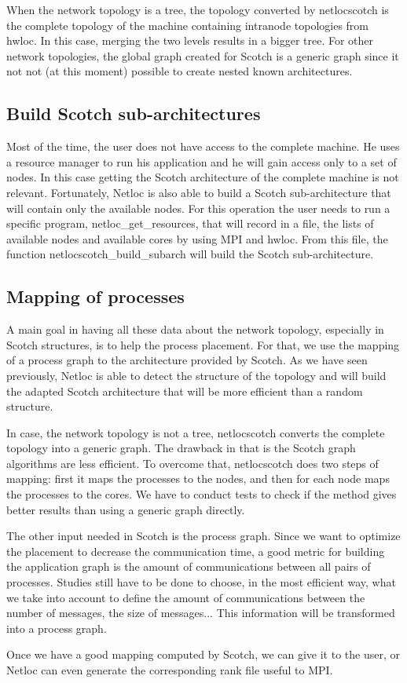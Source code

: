 When the network topology is a tree, the topology converted by netlocscotch is the complete topology of the machine containing intranode topologies from hwloc. In this case, merging the two levels results in a bigger tree. For other network topologies, the global graph created for Scotch is a generic graph since it not not (at this moment) possible to create nested known architectures.\hypertarget{a00397_netlocscotch_subarch}{}\subsection{Build Scotch sub-\/architectures}\label{a00397_netlocscotch_subarch}
Most of the time, the user does not have access to the complete machine. He uses a resource manager to run his application and he will gain access only to a set of nodes. In this case getting the Scotch architecture of the complete machine is not relevant. Fortunately, Netloc is also able to build a Scotch sub-\/architecture that will contain only the available nodes. For this operation the user needs to run a specific program, netloc\+\_\+get\+\_\+resources, that will record in a file, the lists of available nodes and available cores by using M\+PI and hwloc. From this file, the function netlocscotch\+\_\+build\+\_\+subarch will build the Scotch sub-\/architecture.\hypertarget{a00397_netlocscotch_mapping}{}\subsection{Mapping of processes}\label{a00397_netlocscotch_mapping}
A main goal in having all these data about the network topology, especially in Scotch structures, is to help the process placement. For that, we use the mapping of a process graph to the architecture provided by Scotch. As we have seen previously, Netloc is able to detect the structure of the topology and will build the adapted Scotch architecture that will be more efficient than a random structure.

In case, the network topology is not a tree, netlocscotch converts the complete topology into a generic graph. The drawback in that is the Scotch graph algorithms are less efficient. To overcome that, netlocscotch does two steps of mapping\+: first it maps the processes to the nodes, and then for each node maps the processes to the cores. We have to conduct tests to check if the method gives better results than using a generic graph directly.

The other input needed in Scotch is the process graph. Since we want to optimize the placement to decrease the communication time, a good metric for building the application graph is the amount of communications between all pairs of processes. Studies still have to be done to choose, in the most efficient way, what we take into account to define the amount of communications between the number of messages, the size of messages... This information will be transformed into a process graph.

Once we have a good mapping computed by Scotch, we can give it to the user, or Netloc can even generate the corresponding rank file useful to M\+PI. 